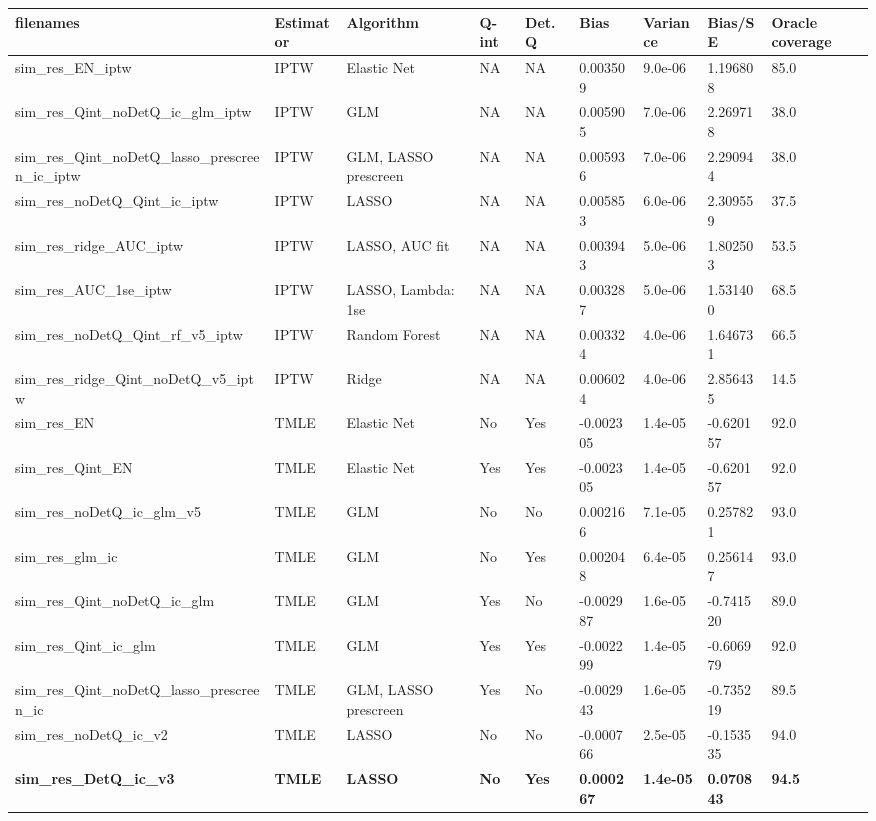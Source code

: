 
\begin{longtable}[l]{lllllllll}
\toprule
filenames & Estimator & Algorithm & Q-int & Det. Q & Bias & Variance & Bias/SE & Oracle coverage\\
\midrule
sim\_res\_EN\_iptw & IPTW & Elastic Net & NA & NA & 0.003509 & 9.0e-06 & 1.196808 & 85.0\\
sim\_res\_Qint\_noDetQ\_ic\_glm\_iptw & IPTW & GLM & NA & NA & 0.005905 & 7.0e-06 & 2.269718 & 38.0\\
sim\_res\_Qint\_noDetQ\_lasso\_prescreen\_ic\_iptw & IPTW & GLM, LASSO prescreen & NA & NA & 0.005936 & 7.0e-06 & 2.290944 & 38.0\\
sim\_res\_noDetQ\_Qint\_ic\_iptw & IPTW & LASSO & NA & NA & 0.005853 & 6.0e-06 & 2.309559 & 37.5\\
sim\_res\_ridge\_AUC\_iptw & IPTW & LASSO, AUC fit & NA & NA & 0.003943 & 5.0e-06 & 1.802503 & 53.5\\
sim\_res\_AUC\_1se\_iptw & IPTW & LASSO, Lambda: 1se & NA & NA & 0.003287 & 5.0e-06 & 1.531400 & 68.5\\
sim\_res\_noDetQ\_Qint\_rf\_v5\_iptw & IPTW & Random Forest & NA & NA & 0.003324 & 4.0e-06 & 1.646731 & 66.5\\
sim\_res\_ridge\_Qint\_noDetQ\_v5\_iptw & IPTW & Ridge & NA & NA & 0.006024 & 4.0e-06 & 2.856435 & 14.5\\
sim\_res\_EN & TMLE & Elastic Net & No & Yes & -0.002305 & 1.4e-05 & -0.620157 & 92.0\\
sim\_res\_Qint\_EN & TMLE & Elastic Net & Yes & Yes & -0.002305 & 1.4e-05 & -0.620157 & 92.0\\
sim\_res\_noDetQ\_ic\_glm\_v5 & TMLE & GLM & No & No & 0.002166 & 7.1e-05 & 0.257821 & 93.0\\
sim\_res\_glm\_ic & TMLE & GLM & No & Yes & 0.002048 & 6.4e-05 & 0.256147 & 93.0\\
sim\_res\_Qint\_noDetQ\_ic\_glm & TMLE & GLM & Yes & No & -0.002987 & 1.6e-05 & -0.741520 & 89.0\\
sim\_res\_Qint\_ic\_glm & TMLE & GLM & Yes & Yes & -0.002299 & 1.4e-05 & -0.606979 & 92.0\\
sim\_res\_Qint\_noDetQ\_lasso\_prescreen\_ic & TMLE & GLM, LASSO prescreen & Yes & No & -0.002943 & 1.6e-05 & -0.735219 & 89.5\\
sim\_res\_noDetQ\_ic\_v2 & TMLE & LASSO & No & No & -0.000766 & 2.5e-05 & -0.153535 & 94.0\\
\midrule
\textbf{sim\_res\_DetQ\_ic\_v3} & \textbf{TMLE} & \textbf{LASSO} & \textbf{No} & \textbf{Yes} & \textbf{0.000267} & \textbf{1.4e-05} & \textbf{0.070843} & \textbf{94.5}\\

\end{longtable}

